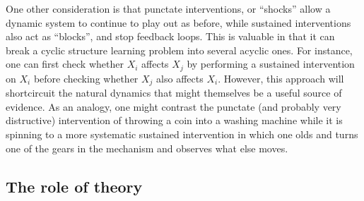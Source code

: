 \documentclass{cambridge7A}%
\begin{document}
One other consideration is that punctate interventions, or ``shocks'' allow a dynamic system to continue to play out as before,  while sustained interventions also act as ``blocks'', and stop feedback loops.  This is valuable in that it can break a cyclic structure learning problem into several acyclic ones.  For instance, one can first check whether $X_i$ affects $X_j$ by performing a sustained intervention on $X_i$ before checking whether $X_j$ also affects $X_i$.  However, this approach will shortcircuit the natural dynamics that might themselves be a useful source of evidence.  As an analogy, one might contrast the punctate (and probably very distructive) intervention of throwing a coin into a washing machine while it is spinning to a more systematic sustained intervention in which one olds and turns one of the gears in the mechanism and observes what else moves.  %

\subsection{The role of theory}
\end{document}

